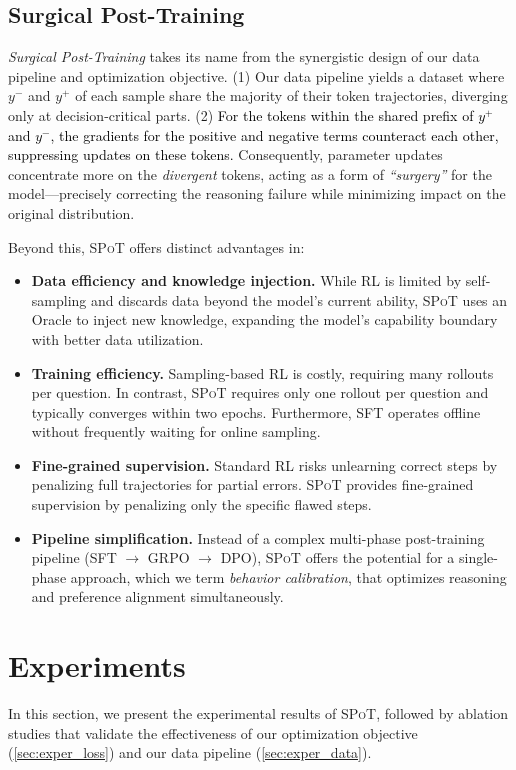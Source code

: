 \documentclass{article}
\newcommand{\methodName}{{\textsc{SPoT}}\xspace}
\newcommand{\modify}[1]{\textcolor{black}{#1}} %
\theoremstyle{plain}
\theoremstyle{definition}
\theoremstyle{remark}
\begin{document}
\subsection{Surgical Post-Training}

\textit{Surgical Post-Training} takes its name from the synergistic design of our data pipeline and optimization objective. (1) Our data pipeline yields a dataset where $y^-$ and $y^+$ of each sample share the majority of their token trajectories, diverging only at decision-critical parts. (2) \modify{For the tokens within the shared prefix of $y^+$ and $y^-$, the gradients for the positive and negative terms counteract each other, suppressing updates on these tokens. } Consequently, parameter updates concentrate more on the \textit{divergent} tokens, acting as a form of \textit{``surgery''} for the model—precisely correcting the reasoning failure while minimizing impact on the original distribution.




Beyond this, \methodName offers distinct advantages in:
\begin{itemize}
    \item \textbf{Data efficiency and knowledge injection.} While RL is limited by self-sampling and discards data beyond the model's current ability, \methodName uses an Oracle to inject new knowledge, expanding the model's capability boundary with better data utilization.
    \item \textbf{Training efficiency.} Sampling-based RL is costly, requiring many rollouts per question. In contrast, \methodName requires only one rollout per question and typically converges within two epochs. Furthermore, SFT operates offline without frequently waiting for online sampling.
    \item \textbf{Fine-grained supervision.} Standard RL risks unlearning correct steps by penalizing full trajectories for partial errors. \methodName provides fine-grained supervision by penalizing only the specific flawed steps.
    \item \textbf{Pipeline simplification.} Instead of a complex multi-phase post-training pipeline (SFT $\to$ GRPO $\to$ DPO), \methodName offers the potential for a single-phase approach, which we term \textit{behavior calibration}, that optimizes reasoning and preference alignment simultaneously.
\end{itemize}



\section{Experiments}
In this section, we present the experimental results of \methodName, followed by ablation studies that validate the effectiveness of our optimization objective (\cref{sec:exper_loss}) and our data pipeline (\cref{sec:exper_data}).
\end{document}
